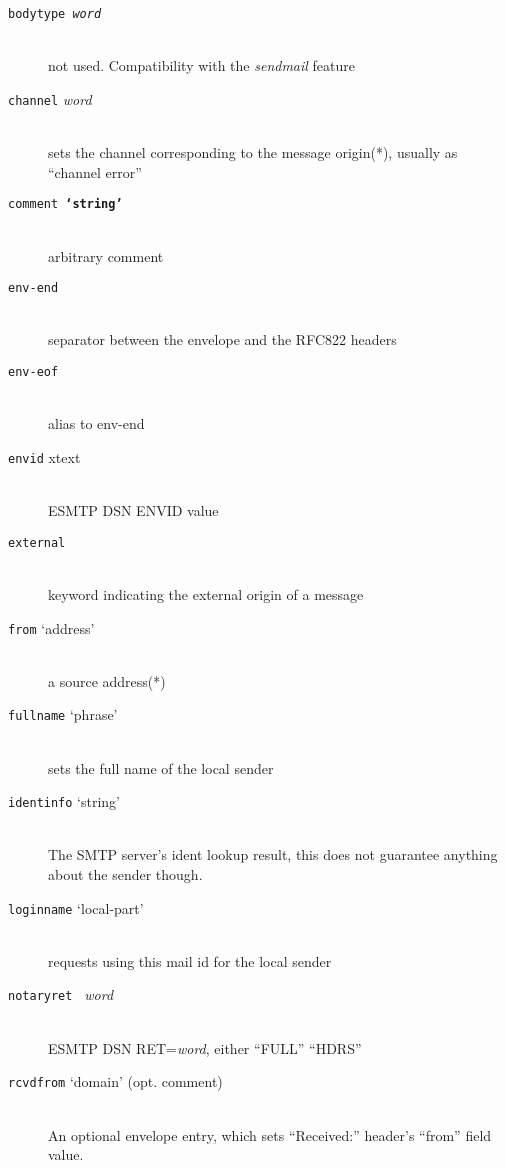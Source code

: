 \begin{description}
\item[{\tt bodytype {\em word}} ] \mbox{} \\
not used. Compatibility with the {\em sendmail} feature 

\item[{\tt channel} {\em word}] \mbox{} \\
sets the channel corresponding to the message origin(*),
usually as ``channel error''

\item[{\tt comment {\bf `string'}} ] \mbox{} \\
arbitrary comment

\item[{\tt env-end}] \mbox{} \\
separator between the envelope and the RFC822 headers

\item[{\tt env-eof}] \mbox{} \\
alias to env-end

\item[{\tt envid} xtext] \mbox{} \\
ESMTP DSN ENVID value

\item[{\tt external}] \mbox{} \\
keyword indicating the external origin of a message

\item[{\tt from} `address'] \mbox{} \\
a source address(*)

\item[{\tt fullname} `phrase'] \mbox{} \\
sets the full name of the local sender

\item[{\tt identinfo} `string'] \mbox{} \\
The SMTP server's ident lookup result, this does not guarantee anything
about the sender though.

\item[{\tt loginname} `local-part'] \mbox{} \\
requests using this mail id for the local sender

\item[{\tt notaryret } {\em word}] \mbox{} \\
ESMTP DSN RET={\em word}, either ``FULL'' ``HDRS''

\item[{\tt rcvdfrom} `domain' (opt. comment)] \mbox{}\\
An optional envelope entry, which sets ``Received:'' header's
``from'' field value.


\end{description}
